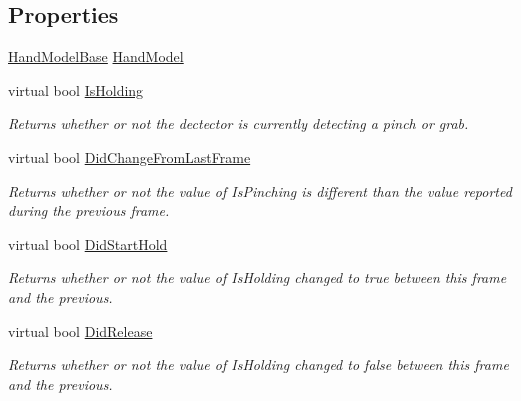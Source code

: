 \subsection*{Properties}
\begin{DoxyCompactItemize}
\item 
\mbox{\hyperlink{class_leap_1_1_unity_1_1_hand_model_base}{Hand\+Model\+Base}} \mbox{\hyperlink{class_leap_1_1_unity_1_1_abstract_hold_detector_a0c3980d75103d874c1e2e318d53ea4f6}{Hand\+Model}}
\item 
virtual bool \mbox{\hyperlink{class_leap_1_1_unity_1_1_abstract_hold_detector_a90ae2a600e5d9183d4441035a2304846}{Is\+Holding}}
\begin{DoxyCompactList}\small\item\em Returns whether or not the dectector is currently detecting a pinch or grab. \end{DoxyCompactList}\item 
virtual bool \mbox{\hyperlink{class_leap_1_1_unity_1_1_abstract_hold_detector_acc454a423b49d479417b6cbacbfbe58f}{Did\+Change\+From\+Last\+Frame}}
\begin{DoxyCompactList}\small\item\em Returns whether or not the value of Is\+Pinching is different than the value reported during the previous frame. \end{DoxyCompactList}\item 
virtual bool \mbox{\hyperlink{class_leap_1_1_unity_1_1_abstract_hold_detector_abfd4857ecfa5343c3567ac14323f405c}{Did\+Start\+Hold}}
\begin{DoxyCompactList}\small\item\em Returns whether or not the value of Is\+Holding changed to true between this frame and the previous. \end{DoxyCompactList}\item 
virtual bool \mbox{\hyperlink{class_leap_1_1_unity_1_1_abstract_hold_detector_af7297ca8cb27686b12bef6632865a462}{Did\+Release}}
\begin{DoxyCompactList}\small\item\em Returns whether or not the value of Is\+Holding changed to false between this frame and the previous. \end{DoxyCompactList}\item 

\end{DoxyCompactItemize}
